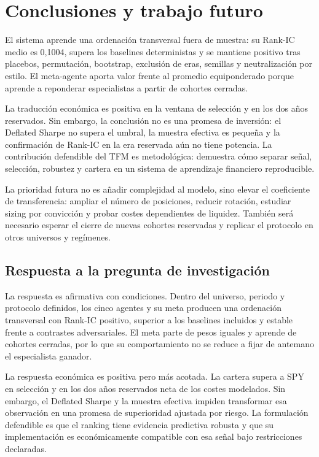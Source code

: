 \chapter{Conclusiones y trabajo futuro}

El sistema aprende una ordenación transversal fuera de muestra: su Rank-IC medio es 0,1004, supera
los baselines deterministas y se mantiene positivo tras placebos, permutación, bootstrap, exclusión
de eras, semillas y neutralización por estilo. El meta-agente aporta valor frente al promedio
equiponderado porque aprende a reponderar especialistas a partir de cohortes cerradas.

La traducción económica es positiva en la ventana de selección y en los dos años reservados. Sin
embargo, la conclusión no es una promesa de inversión: el Deflated Sharpe no supera el umbral, la
muestra efectiva es pequeña y la confirmación de Rank-IC en la era reservada aún no tiene potencia.
La contribución defendible del TFM es metodológica: demuestra cómo separar señal, selección,
robustez y cartera en un sistema de aprendizaje financiero reproducible.

La prioridad futura no es añadir complejidad al modelo, sino elevar el coeficiente de transferencia:
ampliar el número de posiciones, reducir rotación, estudiar sizing por convicción y probar costes
dependientes de liquidez. También será necesario esperar el cierre de nuevas cohortes reservadas y
replicar el protocolo en otros universos y regímenes.

\section{Respuesta a la pregunta de investigación}

La respuesta es afirmativa con condiciones. Dentro del universo, periodo y protocolo definidos, los
cinco agentes y su meta producen una ordenación transversal con Rank-IC positivo, superior a los
baselines incluidos y estable frente a contrastes adversariales. El meta parte de pesos iguales y
aprende de cohortes cerradas, por lo que su comportamiento no se reduce a fijar de antemano el
especialista ganador.

La respuesta económica es positiva pero más acotada. La cartera supera a SPY en selección y en los
dos años reservados neta de los costes modelados. Sin embargo, el Deflated Sharpe y la muestra
efectiva impiden transformar esa observación en una promesa de superioridad ajustada por riesgo. La
formulación defendible es que el ranking tiene evidencia predictiva robusta y que su implementación
es económicamente compatible con esa señal bajo restricciones declaradas.

